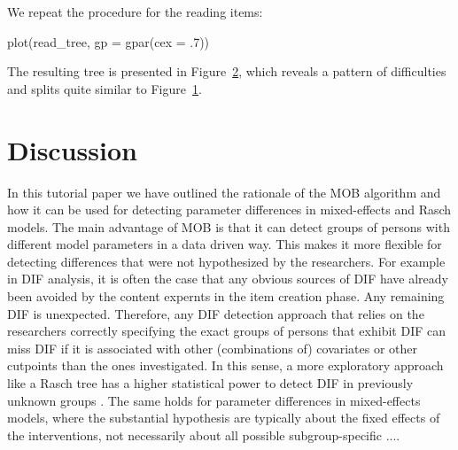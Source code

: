 \documentclass[doc,floatsintext,natbib]{apa7}
\begin{document}
\begin{figure}%
\caption{Rasch tree for the four math items.}
\begin{subfigure}{1.25\textwidth}
\end{subfigure}
\label{fig:math_tree}
\end{figure}%

We repeat the procedure for the reading items:

\begin{Schunk}
\end{Schunk}

\begin{Schunk}
\begin{Sinput}
 plot(read_tree, gp = gpar(cex = .7))
\end{Sinput}
\end{Schunk}

The resulting tree is presented in Figure~\ref{fig:read_tree}, which reveals a pattern of difficulties and splits quite similar to Figure~\ref{fig:math_tree}.

\begin{figure}%
\caption{Rasch tree for the four reading items.}
\begin{subfigure}{1.25\textwidth}
\end{subfigure}
\label{fig:read_tree}
\end{figure}




\FloatBarrier
\section{Discussion}

In this tutorial paper we have outlined the rationale of the MOB algorithm and how it can be used for detecting parameter differences in mixed-effects and Rasch models. The main advantage of MOB is that it can detect groups of persons with different model parameters in a data driven way. This makes it more flexible for detecting differences that were not hypothesized by the researchers. For example in DIF analysis, it is often the case that any obvious sources of DIF have already been avoided by the content expernts in the item creation phase. Any remaining DIF is unexpected. Therefore, any DIF detection approach that relies on the researchers correctly specifying the exact groups of persons that exhibit DIF can miss DIF if it is associated with other (combinations of) covariates or other cutpoints than the ones investigated. In this sense, a more exploratory approach like a Rasch tree has a higher statistical power to detect DIF in previously unknown groups \citep{StrKopZei:2015:P}. The same holds for parameter differences in mixed-effects models, where the substantial hypothesis are typically about the fixed effects of the interventions, not necessarily about all possible subgroup-specific .... 
\end{document}
